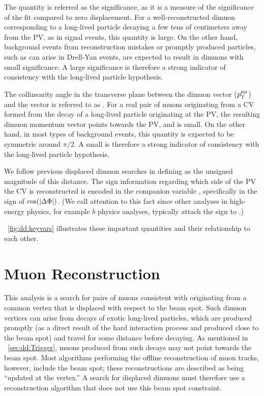 The quantity \LxySig is referred as the \Lxy significance, as it is a measure of the significance of the fit compared to zero displacement.
For a well-reconstructed dimuon corresponding to a long-lived particle decaying a few tens of centimeters away from the PV, as in signal events, this quantity is large.
On the other hand, background events from reconstruction mistakes or promptly produced particles, such as can arise in Drell-Yan events, are expected to result in dimuons with small \Lxy significance.
A large \Lxy significance is therefore a strong indicator of consistency with the long-lived particle hypothesis.

The collinearity angle in the transverse plane between the dimuon \pT vector ($p_{\mathrm{T}}^{\mathrm{\mu}\mathrm{\mu}}$) and the \Lxy vector is referred to as \DeltaPhi.
For a real pair of muons originating from a CV formed from the decay of a long-lived particle originating at the PV, the resulting dimuon momentum vector points towards the PV, and \DeltaPhi is small.
On the other hand, in most types of background events, this quantity is expected to be symmetric around $\pi/2$.
A small \DeltaPhi is therefore a strong indicator of consistency with the long-lived particle hypothesis.

We follow previous displaced dimuon searches \cite{EXO-12-037, CMS-PAS-EXO-14-012, ATLAS} in defining \Lxy as the unsigned magnitude of this distance.
The sign information regarding which side of the PV the CV is reconstructed is encoded in the companion variable \DeltaPhi, specifically in the sign of $\cos(|\Delta\Phi|)$.
(We call attention to this fact since other analyses in high-energy physics, for example $b$ physics analyses, typically attach the sign to \Lxy.)

\Fig~\ref{fig:dd:keyvars} illustrates these important quantities and their relationship to each other.

\section{Muon Reconstruction}
This analysis is a search for pairs of muons consistent with originating from a common vertex that is displaced with respect to the beam spot.
Such dimuon vertices can arise from decays of exotic long-lived particles, which are produced promptly (as a direct result of the hard interaction process and produced close to the beam spot) and travel for some distance before decaying.
As mentioned in \Sec~\ref{sec:dd:Trigger}, muons produced from such decays may not point towards the beam spot.
Most algorithms performing the offline reconstruction of muon tracks, however, include the beam spot; these reconstructions are described as being ``updated at the vertex.''
A search for displaced dimuons must therefore use a reconstruction algorithm that does not use this beam spot constraint.

